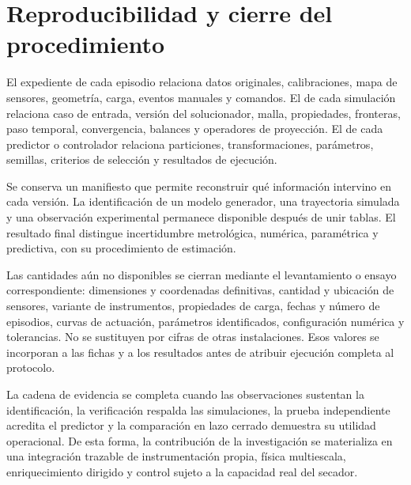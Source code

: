 \section{Reproducibilidad y cierre del procedimiento}
\label{met:reproducibilidad}

El expediente de cada episodio relaciona datos originales, calibraciones, mapa de sensores, geometría, carga, eventos manuales y comandos. El de cada simulación relaciona caso de entrada, versión del solucionador, malla, propiedades, fronteras, paso temporal, convergencia, balances y operadores de proyección. El de cada predictor o controlador relaciona particiones, transformaciones, parámetros, semillas, criterios de selección y resultados de ejecución.

Se conserva un manifiesto que permite reconstruir qué información intervino en cada versión. La identificación de un modelo generador, una trayectoria simulada y una observación experimental permanece disponible después de unir tablas. El resultado final distingue incertidumbre metrológica, numérica, paramétrica y predictiva, con su procedimiento de estimación.

Las cantidades aún no disponibles se cierran mediante el levantamiento o ensayo correspondiente: dimensiones y coordenadas definitivas, cantidad y ubicación de sensores, variante de instrumentos, propiedades de carga, fechas y número de episodios, curvas de actuación, parámetros identificados, configuración numérica y tolerancias. No se sustituyen por cifras de otras instalaciones. Esos valores se incorporan a las fichas y a los resultados antes de atribuir ejecución completa al protocolo.

La cadena de evidencia se completa cuando las observaciones sustentan la identificación, la verificación respalda las simulaciones, la prueba independiente acredita el predictor y la comparación en lazo cerrado demuestra su utilidad operacional. De esta forma, la contribución de la investigación se materializa en una integración trazable de instrumentación propia, física multiescala, enriquecimiento dirigido y control sujeto a la capacidad real del secador.
